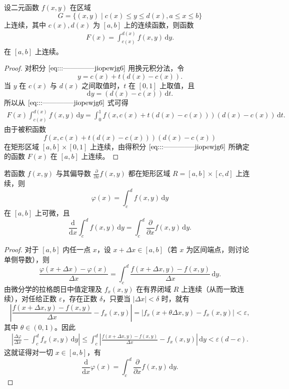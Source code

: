 \documentclass[../../main.tex]{subfiles}%
\begin{document}
\begin{theorem}[连续性]\label{theorem:含参量积分的连续性1}
设二元函数 \( f(x,y) \) 在区域
\[
G = \{ (x,y) \mid c(x) \leqslant y \leqslant d(x), a \leqslant x \leqslant b \}
\]
上连续，其中 \( c(x), d(x) \) 为 \( [a,b] \) 上的连续函数，则函数
\begin{align}
F(x) = \int_{c(x)}^{d(x)} f(x,y) \, \mathrm{d}y. \label{eq:::--------------jiopewjg6}
\end{align}
在 \( [a,b] \) 上连续。
\end{theorem}
\begin{proof}
对积分 \(\eqref{eq:::--------------jiopewjg6}\) 用换元积分法，令
\[
y = c(x) + t(d(x) - c(x)).
\]
当 \( y \) 在 \( c(x) \) 与 \( d(x) \) 之间取值时，\( t \) 在 \( [0,1] \) 上取值，且
\[
\mathrm{d}y = (d(x) - c(x)) \, \mathrm{d}t.
\]
所以从 \(\eqref{eq:::--------------jiopewjg6}\) 式可得
\begin{align*}
F(x)  \int_{c(x)}^{d(x)} f(x,y) \, \mathrm{d}y
= \int_{0}^{1} f(x,c(x) + t(d(x) - c(x))) (d(x) - c(x)) \, \mathrm{d}t.
\end{align*}
由于被积函数
\[
f(x,c(x) + t(d(x) - c(x))) (d(x) - c(x))
\]
在矩形区域 \( [a,b] \times [0,1] \) 上连续，由得积分 \(\eqref{eq:::--------------jiopewjg6}\) 所确定的函数 \( F(x) \) 在 \( [a,b] \) 上连续。
\end{proof}

\begin{theorem}[可微性]\label{theorem:含参量积分的可微性1}
若函数 \( f(x,y) \) 与其偏导数 \( \frac{\partial}{\partial x}f(x,y) \) 都在矩形区域 \( R = [a,b] \times [c,d] \) 上连续，则
\[
\varphi(x) = \int_{c}^{d} f(x,y) \, \mathrm{d}y
\]
在 \( [a,b] \) 上可微，且
\[
\frac{\mathrm{d}}{\mathrm{d}x} \int_{c}^{d} f(x,y) \, \mathrm{d}y = \int_{c}^{d} \frac{\partial}{\partial x} f(x,y) \, \mathrm{d}y.
\]
\end{theorem}
\begin{proof}
对于 \( [a,b] \) 内任一点 \( x \)，设 \( x + \Delta x \in [a,b] \)（若 \( x \) 为区间端点，则讨论单侧导数），则
\[
\frac{\varphi(x + \Delta x) - \varphi(x)}{\Delta x} = \int_{c}^{d} \frac{f(x + \Delta x,y) - f(x,y)}{\Delta x} \, \mathrm{d}y.
\]
由微分学的拉格朗日中值定理及 \( f_x(x,y) \) 在有界闭域 \( R \) 上连续（从而一致连续），对任给正数 \( \varepsilon \)，存在正数 \( \delta \)，只要当 \( |\Delta x| < \delta \) 时，就有
\[
\left| \frac{f(x + \Delta x,y) - f(x,y)}{\Delta x} - f_x(x,y) \right|
= |f_x(x + \theta \Delta x,y) - f_x(x,y)| < \varepsilon,
\]
其中 \( \theta \in (0,1) \)。因此
\begin{align*}
\left| \frac{\Delta \varphi}{\Delta x} - \int_{c}^{d} f_x(x,y) \, \mathrm{d}y \right|
\leqslant \int_{c}^{d} \left| \frac{f(x + \Delta x,y) - f(x,y)}{\Delta x} - f_x(x,y) \right| \, \mathrm{d}y
< \varepsilon(d - c).
\end{align*}
这就证得对一切 \( x \in [a,b] \)，有
\[
\frac{\mathrm{d}}{\mathrm{d}x} \varphi(x) = \int_{c}^{d} \frac{\partial}{\partial x} f(x,y) \, \mathrm{d}y.
\]
\end{proof}
\end{document}
